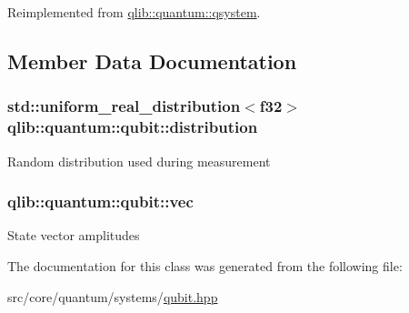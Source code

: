 Reimplemented from \hyperlink{classqlib_1_1quantum_1_1qsystem_a9d95030955e2fdb26bc9152c32310e7e}{qlib\+::quantum\+::qsystem}.



\subsection{Member Data Documentation}
\subsubsection[{\texorpdfstring{distribution}{distribution}}]{\setlength{\rightskip}{0pt plus 5cm}std\+::uniform\+\_\+real\+\_\+distribution$<$f32$>$ qlib\+::quantum\+::qubit\+::distribution\hspace{0.3cm}{\ttfamily [private]}}\hypertarget{classqlib_1_1quantum_1_1qubit_abb97216eead736ab87e8756b9b4c2ce9}{}\label{classqlib_1_1quantum_1_1qubit_abb97216eead736ab87e8756b9b4c2ce9}
Random distribution used during measurement 
\subsubsection[{\texorpdfstring{vec}{vec}}]{ qlib\+::quantum\+::qubit\+::vec\hspace{0.3cm}{\ttfamily [private]}}\hypertarget{classqlib_1_1quantum_1_1qubit_a8f6e33dd5d0673f195360bc4b5c5442f}{}\label{classqlib_1_1quantum_1_1qubit_a8f6e33dd5d0673f195360bc4b5c5442f}
State vector amplitudes 

The documentation for this class was generated from the following file\+:\begin{DoxyCompactItemize}
\item 
src/core/quantum/systems/\hyperlink{qubit_8hpp}{qubit.\+hpp}\end{DoxyCompactItemize}
